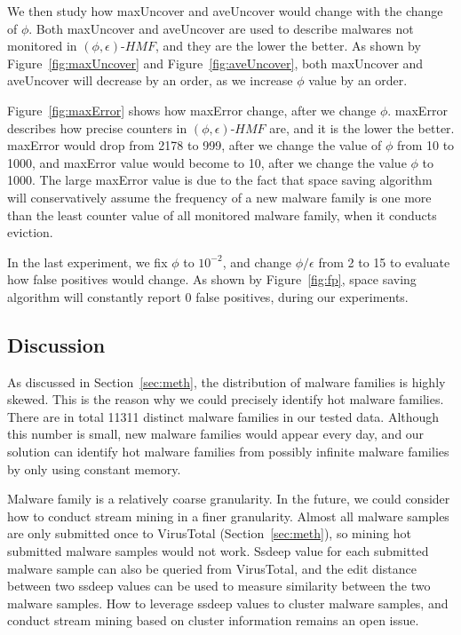 We then study how maxUncover and aveUncover would change with the change of $\phi$.
Both maxUncover and aveUncover are used to describe malwares not monitored in $(\phi, \epsilon)\mbox{-}HMF$, 
and they are the lower the better. As shown by Figure~\ref{fig:maxUncover} and Figure~\ref{fig:aveUncover}, 
both maxUncover and aveUncover will decrease by an order, as we increase $\phi$ value by an order. 

Figure~\ref{fig:maxError} shows how maxError change, 
after we change $\phi$. 
maxError describes how precise counters in $(\phi, \epsilon)\mbox{-}HMF$ are, 
and it is the lower the better. 
maxError would drop from 2178 to 999, after we change the value of $\phi$ from 10 to 1000, 
and maxError value would become to 10, after we change the value $\phi$ to 1000. 
The large maxError value is due to the fact that space saving algorithm will conservatively 
assume the frequency of a new malware family is one more than the least counter value of all monitored malware family, 
when it conducts eviction. 

In the last experiment, we fix $\phi$ to $10^{-2}$, 
and change $\phi/\epsilon$ from 2 to 15 to evaluate how false positives would change. 
As shown by Figure~\ref{fig:fp}, space saving algorithm will constantly report 0 false positives, during our experiments. 

\subsection{Discussion}
\label{sec:discussion1}
As discussed in Section~\ref{sec:meth}, 
the distribution of malware families is highly skewed. 
This is the reason why we could precisely identify hot malware families. 
There are in total 11311 distinct malware families in our tested data. 
Although this number is small, new malware families would appear every day, 
and our solution can identify hot malware families from possibly 
infinite malware families by only using constant memory. 

Malware family is a relatively coarse granularity. 
In the future, we could consider how to conduct stream mining in a finer granularity. 
Almost all malware samples are only submitted once to VirusTotal (Section~\ref{sec:meth}), 
so mining hot submitted malware samples would not work. 
Ssdeep value for each submitted malware sample can also be queried from VirusTotal, 
and the edit distance between two ssdeep values can be used to measure similarity between the two malware samples. 
How to leverage ssdeep values to cluster malware samples, 
and conduct stream mining based on cluster information remains an open issue.  